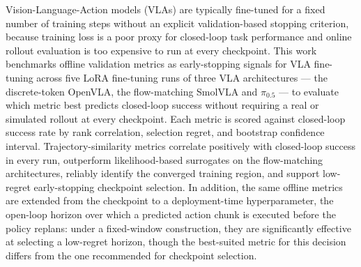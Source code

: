\documentclass[english,12pt,a4paper,pdftex,elec,utf8]{aaltothesis}
\begin{document}
\makecoverpage



\begin{abstractpage}[english]

Vision-Language-Action models (VLAs) are typically fine-tuned for a fixed number of training steps without an explicit validation-based stopping criterion, because training loss is a poor proxy for closed-loop task performance and online rollout evaluation is too expensive to run at every checkpoint. This work benchmarks offline validation metrics as early-stopping signals for VLA fine-tuning across five LoRA fine-tuning runs of three VLA architectures --- the discrete-token OpenVLA, the flow-matching SmolVLA and $\pi_{0.5}$ --- to evaluate which metric best predicts closed-loop success without requiring a real or simulated rollout at every checkpoint. Each metric is scored against closed-loop success rate by rank correlation, selection regret, and bootstrap confidence interval. Trajectory-similarity metrics correlate positively with closed-loop success in every run, outperform likelihood-based surrogates on the flow-matching architectures, reliably identify the converged training region, and support low-regret early-stopping checkpoint selection. In addition, the same offline metrics are extended from the checkpoint to a deployment-time hyperparameter, the open-loop horizon over which a predicted action chunk is executed before the policy replans: under a fixed-window construction, they are significantly effective at selecting a low-regret horizon, though the best-suited metric for this decision differs from the one recommended for checkpoint selection.
\end{abstractpage}
\end{document}
